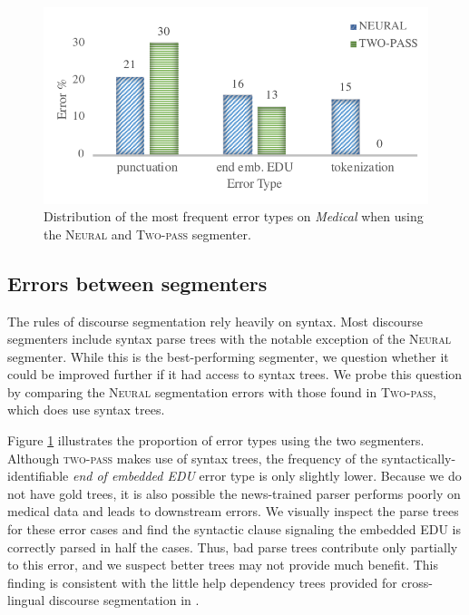 \begin{figure}
    \centering
    \includegraphics[scale=0.5]{plots/anno_errors_feng.pdf}
    \vspace{-1.2em}
    \caption{Distribution of the most frequent error types on \textit{Medical} when using the \textsc{Neural} and \textsc{Two-pass} segmenter.}
    \label{fig:errors_syntax}
\end{figure}

\subsection{Errors between segmenters}
\label{sec:errors_segmenters}
The rules of discourse segmentation rely heavily on syntax. Most discourse segmenters include syntax parse trees with the notable exception of the \textsc{Neural} segmenter. While this is the best-performing segmenter, we question whether it could be improved further if it had access to syntax trees. We probe this question by comparing the \textsc{Neural} segmentation errors with those found in \textsc{Two-pass}, which does use syntax trees. 

Figure \ref{fig:errors_syntax} illustrates the proportion of error types using the two segmenters. Although \textsc{two-pass} makes use of syntax trees, the frequency of the syntactically-identifiable \textit{end of embedded EDU} error type is only slightly lower. Because we do not have gold trees, it is also possible the news-trained parser performs poorly on medical data and leads to downstream errors. We visually inspect the parse trees for these error cases and find the syntactic clause signaling the embedded EDU is correctly parsed in half the cases. Thus, bad parse trees contribute only partially to this error, and we suspect better trees may not provide much benefit. This finding is consistent with the little help dependency trees provided for cross-lingual discourse segmentation in .

